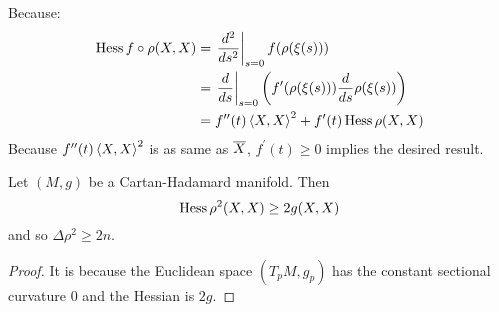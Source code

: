\begin{enumerate}[label=\arabic{*}]
\begin{rmk}
		Because:
		\begin{equation*}
			\begin{aligned}
				\operatorname{Hess} f\circ\rho(X,X) &= \left.\frac{d^2}{ds^2}\right\lvert_{s=0} f(\rho(\xi(s))) \\
				&= \left.\frac{d}{ds}\right\lvert_{s=0}\left(f^\prime(\rho(\xi(s))) \frac{d}{ds}\rho(\xi(s))\right) \\
				&= f^{\prime\prime}(t)\left\langle X,X \right\rangle^2 + f^\prime(t)\operatorname{Hess}\rho(X,X) \\
			\end{aligned}
		\end{equation*}
		Because $f^{\prime\prime}(t)\left\langle X,X \right\rangle^2$ is as same as $\overline{X}$, $f^\prime(t) \geq 0$ implies the desired result.
	\end{rmk}
	\begin{cor}
		Let $(M,g)$ be a Cartan-Hadamard manifold. Then
		\begin{equation*}
			\operatorname{Hess}\rho^2(X,X) \geq 2g(X,X)
		\end{equation*}
		and so $\Delta \rho^2 \geq 2n$.
	\end{cor}
	\begin{proof}
		It is because the Euclidean space $(T_pM,g_p)$ has the constant sectional curvature $0$ and the Hessian is $2g$.
	\end{proof}


\end{enumerate}
